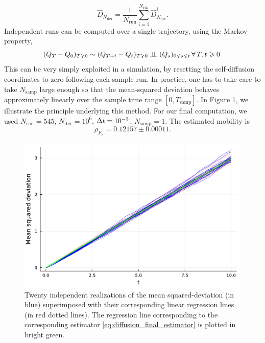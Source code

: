     \begin{equation}
        \label{eq:diffusion_final_estimator}
        \widehat{D}_{N_{\mathrm{iter}}}=\frac{1}{N_{\mathrm{run}}}\sum_{i=1}^{N_{\mathrm{run}}}\widehat{D}^i_{N_{\mathrm{iter}}}.
    \end{equation}
    Independent runs can be computed over a single trajectory, using the Markov property,
    \[(Q_T-Q_0)_{T\geqslant 0} \sim (Q_{T+t}-Q_t)_{T\geqslant 0} \mathrel{\perp\!\!\!\perp} (Q_s)_{0\leqslant s\leqslant t}\,\forall\,T,t\geqslant 0.\]
    This can be very simply exploited in a simulation, by resetting the self-diffusion coordinates to zero following each sample run. 
    In practice, one has to take care to take $N_{\mathrm{samp}}$ large enough so that the mean-squared deviation behaves approximately linearly over the sample time range $[0,T_{\mathrm{samp}}]$.
    In Figure \ref{fig:einstein_demo}, we illustrate the principle underlying this method. 
    For our final computation, we used $N_{\mathrm{run}}=545$, $N_{\mathrm{iter}}=10^6$, ${\Delta t}=10^{-3}$, $N_{\mathrm{samp}}=1$.
    The estimated mobility is 
    \begin{equation}
        \label{eq:einstein_est_mobility}
        \rho_{F_{\mathrm{S}}}=0.12157\pm 0.00011.
    \end{equation}

\begin{figure}[htbp]
    \begin{center}
      \includegraphics[width=0.8\linewidth]{figures/einstein_demo.pdf}
      \caption{ \label{fig:einstein_demo}
        Twenty independent realizations of the mean squared-deviation (in blue) superimposed with their corresponding linear regression lines (in red dotted lines).
        The regression line corresponding to the corresponding estimator \eqref{eq:diffusion_final_estimator} is plotted in bright green.
      }
    \end{center}
  \end{figure}
